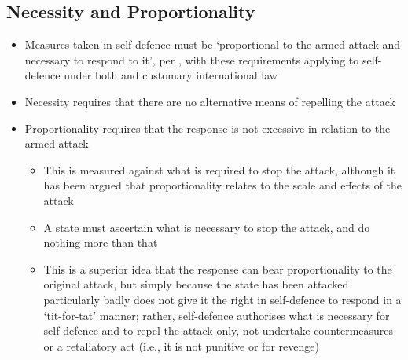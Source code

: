 \subsection{Necessity and Proportionality}
\begin{itemize}
    \item Measures taken in self-defence must be `proportional to the armed attack and necessary to respond to it', per , with these requirements applying to self-defence under both  and customary international law
    \item Necessity requires that there are no alternative means of repelling the attack
    \item Proportionality requires that the response is not excessive in relation to the armed attack
    \begin{itemize}
        \item This is measured against what is required to stop the attack, although it has been argued that proportionality relates to the scale and effects of the attack
        \item A state must ascertain what is necessary to stop the attack, and do nothing more than that
        \item This is a superior idea that the response can bear proportionality to the original attack, but simply because the state has been attacked particularly badly does not give it the right in self-defence to respond in a `tit-for-tat' manner; rather, self-defence authorises what is necessary for self-defence and to repel the attack only, not undertake countermeasures or a retaliatory act (i.e., it is not punitive or for revenge)
    \end{itemize}
\end{itemize}


